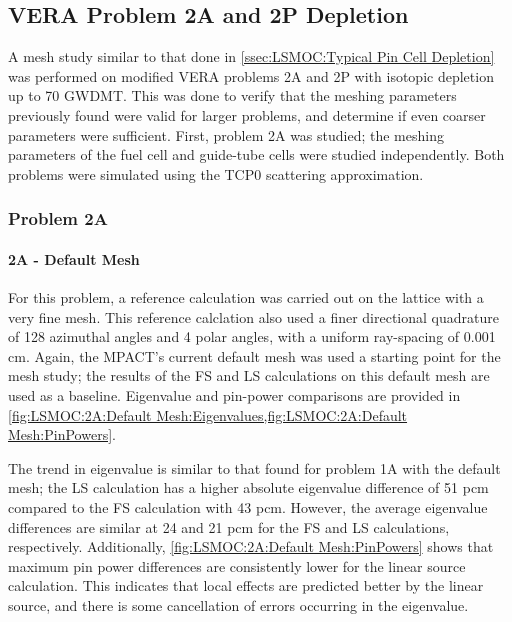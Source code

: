 {{    \subsection{VERA Problem 2A and 2P Depletion}{\label{ssec:LSMOC:VERA Problem 2A and 2P Depletion}
      A mesh study similar to that done in \cref{ssec:LSMOC:Typical Pin Cell Depletion} was performed on modified \ac{VERA} problems 2A and 2P \cite{VERAProblems} with isotopic depletion up to 70 \ac{GWDMT}.
      This was done to verify that the meshing parameters previously found were valid for larger problems, and determine if even coarser parameters were sufficient.
      First, problem 2A was studied; the meshing parameters of the fuel cell and guide-tube cells were studied independently.
      Both problems were simulated using the \ac{TCP0} scattering approximation.
      \subsubsection{Problem 2A}{\label{sssec:LSMOC:Problem 2A}
        \paragraph{2A - Default Mesh}{
          For this problem, a reference calculation was carried out on the lattice with a very fine mesh.
          This reference calclation also used a finer directional quadrature of 128 azimuthal angles and 4 polar angles, with a uniform ray-spacing of 0.001 cm.
          Again, the MPACT's current default mesh was used a starting point for the mesh study; the results of the \ac{FS} and \ac{LS} calculations on this default mesh are used as a baseline.
          Eigenvalue and pin-power comparisons are provided in \cref{fig:LSMOC:2A:Default Mesh:Eigenvalues,fig:LSMOC:2A:Default Mesh:PinPowers}.

          The trend in eigenvalue is similar to that found for problem 1A with the default mesh;
            the \ac{LS} calculation has a higher absolute eigenvalue difference of 51 \ac{pcm} compared to the \ac{FS} calculation with 43 \ac{pcm}.
          However, the average eigenvalue differences are similar at 24 and 21 \ac{pcm} for the \ac{FS} and \ac{LS} calculations, respectively.
          Additionally, \cref{fig:LSMOC:2A:Default Mesh:PinPowers} shows that maximum pin power differences are consistently lower for the linear source calculation.
          This indicates that local effects are predicted better by the linear source, and there is some cancellation of errors occurring in the eigenvalue.

}}}}}
